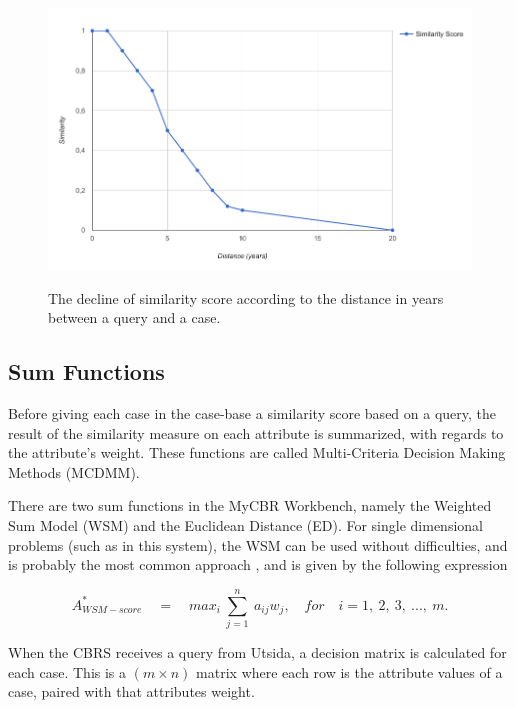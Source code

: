\begin{itemize}
    \begin{figure}[H]
        \centering
        \caption{The decline of similarity score according to the distance in years between a query and a case.}
        \includegraphics[width=1.0\textwidth]{fig/study_period_graph.png}
        \label{fig:study_period_graph}
    \end{figure}
    
\end{itemize}

\subsection{Sum Functions}
Before giving each case in the case-base a similarity score based on a query, the result of the similarity measure on each attribute is summarized, with regards to the attribute's weight. These functions are called Multi-Criteria Decision Making Methods (MCDMM).

There are two sum functions in the MyCBR Workbench, namely the Weighted Sum Model (WSM) and the Euclidean Distance (ED). For single dimensional problems (such as in this system), the WSM can be used without difficulties, and is probably the most common approach \cite{triantaphyllou2000multi}, and is given by the following expression \cite{fishburn1967letter}

\begin{displaymath}
    A^{*}_{WSM-score}\quad =\quad max_{i}\  \sum\limits_{j = 1}^{n}\  a_{ij}w_{j},\quad for \quad i =1,\ 2,\ 3,\ ...,\ m.
\end{displaymath}

When the CBRS receives a query from Utsida, a decision matrix is calculated for each case. This is a $(m \times n)$ matrix where each row is the attribute values of a case, paired with that attributes weight. 


